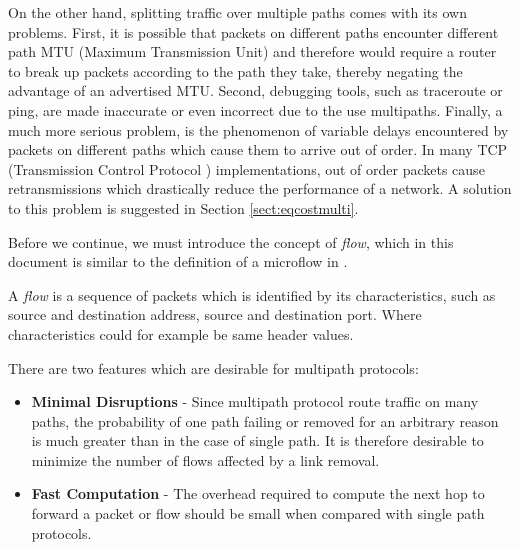 
On the other hand, splitting traffic over multiple paths comes with its own problems. First, it is possible that packets on different paths encounter different path MTU (Maximum Transmission Unit) and therefore would require a router to break up packets according to the path they take, thereby negating the advantage of an advertised MTU. Second, debugging tools, such as traceroute or ping,  are made inaccurate or even incorrect due to the use multipaths. Finally, a much more serious problem, is the phenomenon of variable delays encountered by packets on different paths which cause them to arrive out of order. In many TCP (Transmission Control Protocol \cite{TCP}) implementations, out of order packets cause retransmissions which drastically reduce the performance of a network. A solution to this problem is suggested in Section \ref{sect:eqcostmulti}.

Before we continue, we must introduce the concept of \textit{flow}, which in this document is similar to the definition of a microflow in \cite{RFC2474}. 

\begin{definition}
 A \emph{flow} is a sequence of packets which is identified by its characteristics, such as source and destination address, source and  destination port. Where characteristics could for example be same header values.
\end{definition}

There are two features which are desirable for multipath protocols:
\begin{itemize}
 \item \textbf{Minimal Disruptions} - Since multipath protocol route traffic on many paths, the probability of one path failing or removed for an arbitrary reason is much greater than in the case of single path. It is therefore desirable to minimize the number of flows affected by a link removal.
 \item \textbf{Fast Computation} - The overhead required to compute the next hop to forward a packet or flow should be small when compared with single path protocols.
\end{itemize}



